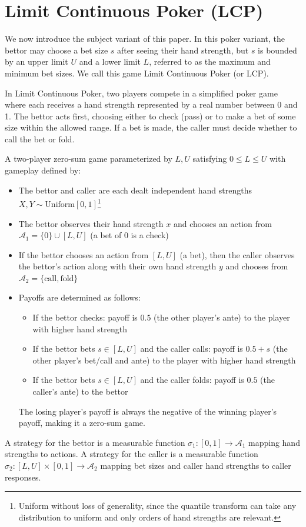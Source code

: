 \documentclass[../../main/main.tex]{subfiles}
\begin{document}
\section{Limit Continuous Poker (LCP)}
\label{sec:lcp}
We now introduce the subject variant of this paper. In this poker variant, the bettor may choose a bet size $s$ after seeing their hand strength, but $s$ is bounded by an upper limit $U$ and a lower limit $L$, referred to as the maximum and minimum bet sizes. We call this game Limit Continuous Poker (or LCP).

In Limit Continuous Poker, two players compete in a simplified poker game where each receives a hand strength represented by a real number between 0 and 1. The bettor acts first, choosing either to check (pass) or to make a bet of some size within the allowed range. If a bet is made, the caller must decide whether to call the bet or fold.

\begin{definition}[LCP]
A two-player zero-sum game parameterized by $L, U$ satisfying $0 \leq L \leq U$ with gameplay defined by:
\begin{itemize}
    \item The bettor and caller are each dealt independent hand strengths $X, Y \sim \text{Uniform}[0,1]$\footnote{Uniform without loss of generality, since the quantile transform can take any distribution to uniform and only orders of hand strengths are relevant.}
    \item The bettor observes their hand strength $x$ and chooses an action from $\mathcal{A}_1 = \{\text{0}\} \cup [L, U]$ (a bet of 0 is a check)
    \item If the bettor chooses an action from $[L, U]$ (a bet), then the caller observes the bettor's action along with their own hand strength $y$ and chooses from $\mathcal{A}_2 = \{\text{call}, \text{fold}\}$ 
    \item Payoffs are determined as follows:
    \begin{itemize}
        \item If the bettor checks: payoff is $0.5$ (the other player's ante) to the player with higher hand strength
        \item If the bettor bets $s \in [L, U]$ and the caller calls: payoff is $0.5 + s$ (the other player's bet/call and ante) to the player with higher hand strength
        \item If the bettor bets $s \in [L, U]$ and the caller folds: payoff is $0.5$ (the caller's ante) to the bettor
    \end{itemize}
    The losing player's payoff is always the negative of the winning player's payoff, making it a zero-sum game.
\end{itemize}

A strategy for the bettor is a measurable function $\sigma_1: [0,1] \to \mathcal{A}_1$ mapping hand strengths to actions. A strategy for the caller is a measurable function $\sigma_2: [L, U] \times [0, 1] \to \mathcal{A}_2$ mapping bet sizes and caller hand strengths to caller responses.
\end{definition}
\end{document}
